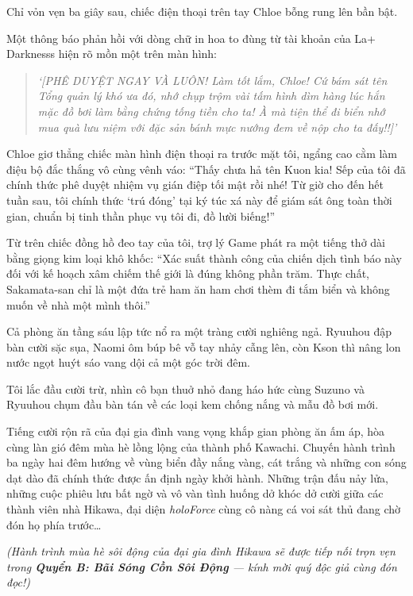 \documentclass[../main.tex]{subfiles}
\begin{document}
Chỉ vỏn vẹn ba giây sau, chiếc điện thoại trên tay Chloe bỗng rung lên bần bật.

Một thông báo phản hồi với dòng chữ in hoa to đùng từ tài khoản của La+ Darknesss hiện rõ mồn một trên màn hình:

\begin{quote}
    \textit{`[PHÊ DUYỆT NGAY VÀ LUÔN! Làm tốt lắm, Chloe! Cứ bám sát tên Tổng quản lý khó ưa đó, nhớ chụp trộm vài tấm hình dìm hàng lúc hắn mặc đồ bơi làm bằng chứng tống tiền cho ta! À mà tiện thể đi biển nhớ mua quà lưu niệm với đặc sản bánh mực nướng đem về nộp cho ta đấy!!]'}
\end{quote}

Chloe giơ thẳng chiếc màn hình điện thoại ra trước mặt tôi, ngẩng cao cằm làm điệu bộ đắc thắng vô cùng vênh váo: ``Thấy chưa hả tên Kuon kia! Sếp của tôi đã chính thức phê duyệt nhiệm vụ gián điệp tối mật rồi nhé! Từ giờ cho đến hết tuần sau, tôi chính thức `trú đóng' tại ký túc xá này để giám sát ông toàn thời gian, chuẩn bị tinh thần phục vụ tôi đi, đồ lười biếng!''

Từ trên chiếc đồng hồ đeo tay của tôi, trợ lý Game phát ra một tiếng thở dài bằng giọng kim loại khô khốc: ``Xác suất thành công của chiến dịch tình báo này đối với kế hoạch xâm chiếm thế giới là đúng không phần trăm. Thực chất, Sakamata-san chỉ là một đứa trẻ ham ăn ham chơi thèm đi tắm biển và không muốn về nhà một mình thôi.''

Cả phòng ăn tầng sáu lập tức nổ ra một tràng cười nghiêng ngả. Ryuuhou đập bàn cười sặc sụa, Naomi ôm búp bê vỗ tay nhảy cẫng lên, còn Kson thì nâng lon nước ngọt huýt sáo vang dội cả một góc trời đêm.

Tôi lắc đầu cười trừ, nhìn cô bạn thuở nhỏ đang háo hức cùng Suzuno và Ryuuhou chụm đầu bàn tán về các loại kem chống nắng và mẫu đồ bơi mới.

Tiếng cười rộn rã của đại gia đình vang vọng khắp gian phòng ăn ấm áp, hòa cùng làn gió đêm mùa hè lồng lộng của thành phố Kawachi. Chuyến hành trình ba ngày hai đêm hướng về vùng biển đầy nắng vàng, cát trắng và những con sóng dạt dào đã chính thức được ấn định ngày khởi hành. Những trận đấu nảy lửa, những cuộc phiêu lưu bất ngờ và vô vàn tình huống dở khóc dở cười giữa các thành viên nhà Hikawa, đại diện \textit{holoForce} cùng cô nàng cá voi sát thủ đang chờ đón họ phía trước\dots

\il

\begin{center}
    \textit{(Hành trình mùa hè sôi động của đại gia đình Hikawa sẽ được tiếp nối trọn vẹn trong \textbf{Quyển B: Bãi Sóng Cồn Sôi Động} — kính mời quý độc giả cùng đón đọc!)}
\end{center}
\end{document}
